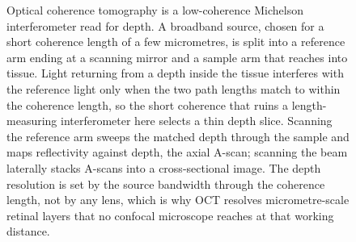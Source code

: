 \begin{figure}[htbp]
\begin{tikzpicture}[>=Stealth, scale=1.0]
\end{tikzpicture}
\caption[Optical coherence tomography]{Optical coherence tomography is a
low-coherence Michelson interferometer read for depth. A broadband source, chosen
for a short coherence length of a few micrometres, is split into a reference arm
ending at a scanning mirror and a sample arm that reaches into tissue. Light
returning from a depth inside the tissue interferes with the reference light only
when the two path lengths match to within the coherence length, so the short
coherence that ruins a length-measuring interferometer here selects a thin depth
slice. Scanning the reference arm sweeps the matched depth through the sample and
maps reflectivity against depth, the axial A-scan; scanning the beam laterally
stacks A-scans into a cross-sectional image. The depth resolution is set by the
source bandwidth through the coherence length, not by any lens, which is why OCT
resolves micrometre-scale retinal layers that no confocal microscope reaches at
that working distance.}
\label{fig:vol04ch11:oct-system}
\end{figure}
